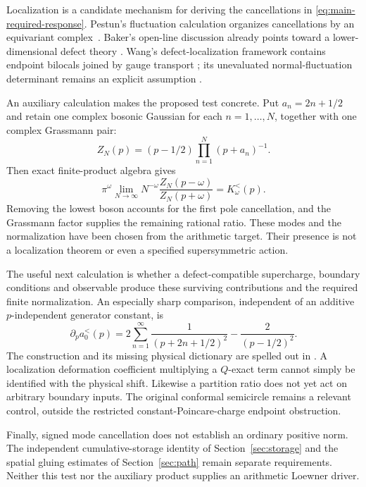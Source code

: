 Localization is a candidate mechanism for deriving the
cancellations in \eqref{eq:main-required-response}. Pestun's
fluctuation calculation organizes cancellations by an
equivariant complex~\cite{Pestun}. Baker's open-line discussion
already points toward a lower-dimensional defect theory
\cite[Section~3.3]{Baker}. Wang's defect-localization framework
contains endpoint bilocals joined by gauge transport
\cite[Section~5.1, equation~(5.5)]{WangDefects}; its unevaluated
normal-fluctuation determinant remains an explicit assumption
\cite[Section~4.4]{WangDefects}.

An auxiliary calculation makes the proposed test concrete. Put
$a_n=2n+1/2$ and retain one complex bosonic Gaussian for each
$n=1,\ldots,N$, together with one complex Grassmann pair:
\begin{equation}\label{eq:main-bf-product}
 Z_N(p)=(p-1/2)\prod_{n=1}^N(p+a_n)^{-1}.
\end{equation}
Then exact finite-product algebra gives
\begin{equation}\label{eq:main-bf-ratio}
 \pi^\omega\lim_{N\to\infty}N^{-\omega}
 \frac{Z_N(p-\omega)}{Z_N(p+\omega)}
 =K_\omega^{<}(p).
\end{equation}
Removing the lowest boson accounts for the first pole
cancellation, and the Grassmann factor supplies the remaining
rational ratio. These modes and the normalization have been
chosen from the arithmetic target. Their presence is not a
localization theorem or even a specified supersymmetric action.

The useful next calculation is whether a defect-compatible
supercharge, boundary conditions and observable produce these
surviving contributions and the required finite normalization.
An especially sharp comparison, independent of an additive
$p$-independent generator constant, is
\begin{equation}\label{eq:main-mode-test}
 \partial_p a_0^{<}(p)
 =2\sum_{n=1}^{\infty}\frac1{(p+2n+1/2)^2}
  -\frac2{(p-1/2)^2}.
\end{equation}
The construction and its missing physical dictionary are
spelled out in \cite[Section~S11]{Supplement}. A localization
deformation coefficient multiplying a $Q$-exact term cannot
simply be identified with the physical shift. Likewise a
partition ratio does not yet act on arbitrary boundary inputs.
The original conformal semicircle remains a relevant control,
outside the restricted constant-Poincare-charge endpoint
obstruction.

Finally, signed mode cancellation does not establish an
ordinary positive norm. The independent cumulative-storage
identity of Section~\ref{sec:storage} and the spatial gluing
estimates of Section~\ref{sec:path} remain separate requirements.
Neither this test nor the auxiliary product supplies an
arithmetic Loewner driver.

